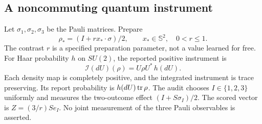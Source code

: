 \subsection{A noncommuting quantum instrument}
Let $\sigma_1,\sigma_2,\sigma_3$ be the Pauli matrices. Prepare
\[
 \rho_*=(I+r x_*\cdot\sigma)/2,\qquad x_*\in\mathbb S^2,\quad0<r\le1.
\]
The contrast $r$ is a specified preparation parameter, not a value learned for free. For Haar probability $h$ on $SU(2)$, the reported positive instrument is
\begin{equation}\label{eq:quantum-kernel}
 \mathcal I(dU)(\rho)=U\rho U^*\,h(dU).
\end{equation}
Each density map is completely positive, and the integrated instrument is trace preserving. Its report probability is $h(dU)\operatorname{tr}\rho$. The audit chooses $I\in\{1,2,3\}$ uniformly and measures the two-outcome effect $(I+S\sigma_I)/2$. The scored vector is $Z=(3/r)S e_I$. No joint measurement of the three Pauli observables is asserted.

